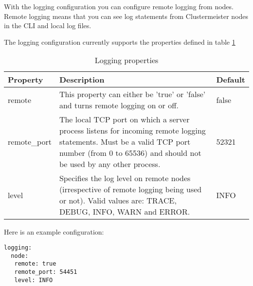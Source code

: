 With the logging configuration you can configure remote logging from nodes. Remote logging means that you can see log statements from Clustermeister nodes in the CLI and local log files.

The logging configuration currently supports the properties defined in table \ref{tab:loggingproperties}

\begin{table}[h]
\centering
\begin{tabular}{| l | p{9cm} | l |}
\hline
\textbf{Property} & \textbf{Description} & \textbf{Default} \\ \hline
remote & This property can either be 'true' or 'false' and turns remote logging on or off. & false \\ \hline
remote\_port & The local TCP port on which a server process listens for incoming remote logging statements. Must be a valid TCP port number (from 0 to 65536) and should not be used by any other process. & 52321 \\ \hline
level & Specifies the log level on remote nodes (irrespective of remote logging being used or not). Valid values are: TRACE, DEBUG, INFO, WARN and ERROR. & INFO \\ \hline
\end{tabular}
\caption{Logging properties}
\label{tab:loggingproperties}
\end{table}

Here is an example configuration:

\begin{lstlisting}[breaklines=true, frame=single]
logging:
  node:
   remote: true
   remote_port: 54451
   level: INFO
\end{lstlisting} 
